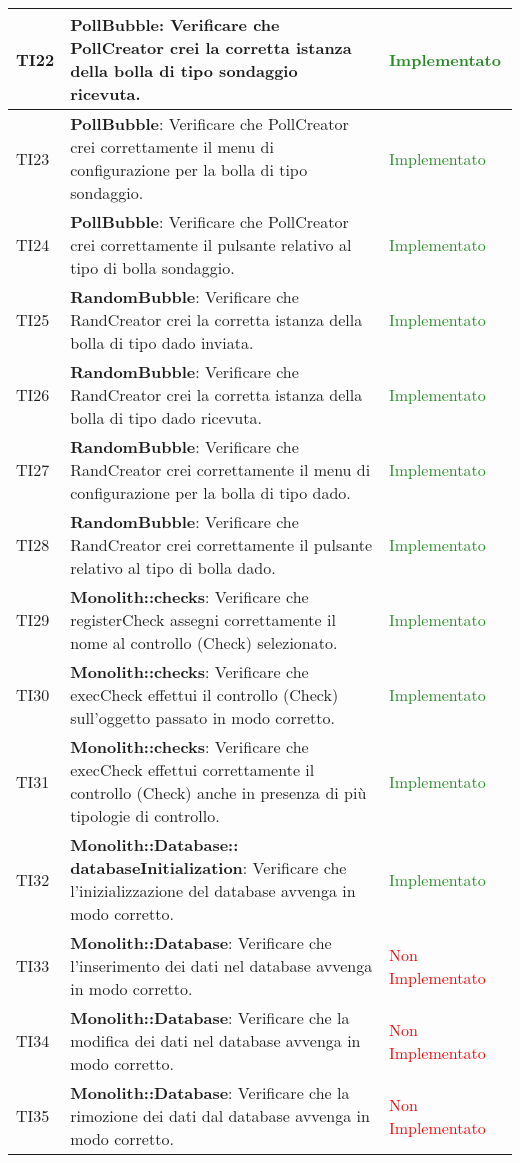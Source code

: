\begin{center}
\begin{longtable}{|
*{1}{>{\centering\arraybackslash}p{1cm}|}
*{1}{>{\centering\arraybackslash}p{7cm}|}
*{1}{>{\centering\arraybackslash}p{3cm}|}}
 \hline 
TI22 & \textbf{PollBubble}: Verificare che PollCreator crei la corretta istanza della bolla di tipo sondaggio ricevuta. & \textcolor{ForestGreen}{Implementato}\\
 \hline 
TI23 & \textbf{PollBubble}: Verificare che PollCreator crei correttamente il menu di configurazione per la bolla di tipo sondaggio. & \textcolor{ForestGreen}{Implementato}\\
 \hline 
TI24 & \textbf{PollBubble}: Verificare che PollCreator crei correttamente il pulsante relativo al tipo di bolla sondaggio. & \textcolor{ForestGreen}{Implementato}\\
 \hline 
TI25 & \textbf{RandomBubble}: Verificare che RandCreator crei la corretta istanza della bolla di tipo dado inviata. & \textcolor{ForestGreen}{Implementato}\\
 \hline 
TI26 & \textbf{RandomBubble}: Verificare che RandCreator crei la corretta istanza della bolla di tipo dado ricevuta. & \textcolor{ForestGreen}{Implementato}\\
 \hline 
TI27 & \textbf{RandomBubble}: Verificare che RandCreator crei correttamente il menu di configurazione per la bolla di tipo dado. & \textcolor{ForestGreen}{Implementato}\\
 \hline 
TI28 & \textbf{RandomBubble}: Verificare che RandCreator crei correttamente il pulsante relativo al tipo di bolla dado. & \textcolor{ForestGreen}{Implementato}\\
 \hline 
TI29 & \textbf{Monolith::checks}: Verificare che registerCheck assegni correttamente il nome al controllo (Check) selezionato. & \textcolor{ForestGreen}{Implementato}\\
 \hline 
TI30 & \textbf{Monolith::checks}: Verificare che execCheck effettui il controllo (Check) sull'oggetto passato in modo corretto. & \textcolor{ForestGreen}{Implementato}\\
 \hline 
TI31 & \textbf{Monolith::checks}: Verificare che execCheck effettui correttamente il controllo (Check) anche in presenza di più tipologie di controllo. & \textcolor{ForestGreen}{Implementato}\\
 \hline 
TI32 & \textbf{Monolith::Database:: databaseInitialization}: Verificare che l'inizializzazione del database avvenga in modo corretto. & \textcolor{ForestGreen}{Implementato}\\
 \hline 
TI33 & \textbf{Monolith::Database}: Verificare che l'inserimento dei dati nel database avvenga in modo corretto. & \textcolor{Red}{Non Implementato}\\
 \hline 
TI34 & \textbf{Monolith::Database}: Verificare che la modifica dei dati nel database avvenga in modo corretto. & \textcolor{Red}{Non Implementato}\\
 \hline 
TI35 & \textbf{Monolith::Database}: Verificare che la rimozione dei dati dal database avvenga in modo corretto. & \textcolor{Red}{Non Implementato}\\
 \hline 
\end{longtable}
\end{center}